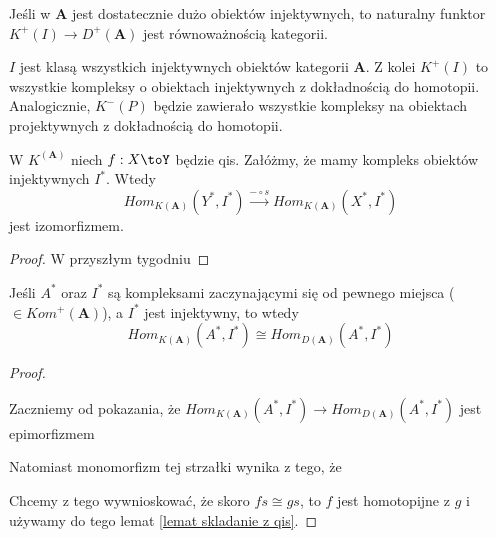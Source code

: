 \begin{theorem}
  Jeśli w $\mathbf{A}$ jest dostatecznie dużo obiektów injektywnych, to naturalny funktor 
  $K^+(I)\to D^+(\mathbf{A})$ jest równoważnością kategorii.
\end{theorem}

$I$ jest klasą wszystkich injektywnych obiektów kategorii $\mathbf{A}$. Z kolei $K^+(I)$ to wszystkie kompleksy o obiektach injektywnych z dokładnością do homotopii. Analogicznie, $K^-(P)$ będzie zawierało wszystkie kompleksy na obiektach projektywnych z dokładnością do homotopii.

\begin{lemma}\label{lemat skladanie z qis}
  W $K^(\mathbf{A})$ niech $f:X\toY$ będzie qis. Załóżmy, że mamy kompleks obiektów injektywnych $I^*$. Wtedy
  $$Hom_{K(\mathbf{A})}(Y^*, I^*)\xrightarrow{-\circ s}Hom_{K(\mathbf{A})}(X^*, I^*)$$
  jest izomorfizmem. 
\end{lemma}

\begin{proof}
  W przyszłym tygodniu
\end{proof}

\begin{conclusion}
  Jeśli $A^*$ oraz $I^*$ są kompleksami zaczynającymi się od pewnego miejsca ($\in Kom^+(\mathbf{A})$), a $I^*$ jest injektywny, to wtedy
  $$Hom_{K(\mathbf{A})}(A^*, I^*)\cong Hom_{D(\mathbf{A})}(A^*, I^*)$$
\end{conclusion}

\begin{proof}
  \begin{center}\end{center}

  Zaczniemy od pokazania, że $Hom_{K(\mathbf{A})}(A^*, I^*)\to Hom_{D(\mathbf{A})}(A^*, I^*)$ jest epimorfizmem
  \begin{center}\end{center}
  
  Natomiast monomorfizm tej strzałki wynika z tego, że 
  \begin{center}\end{center}
  Chcemy z tego wywnioskować, że skoro $fs\cong gs$, to $f$ jest homotopijne z $g$ i używamy do tego lemat \ref{lemat skladanie z qis}.
\end{proof}
